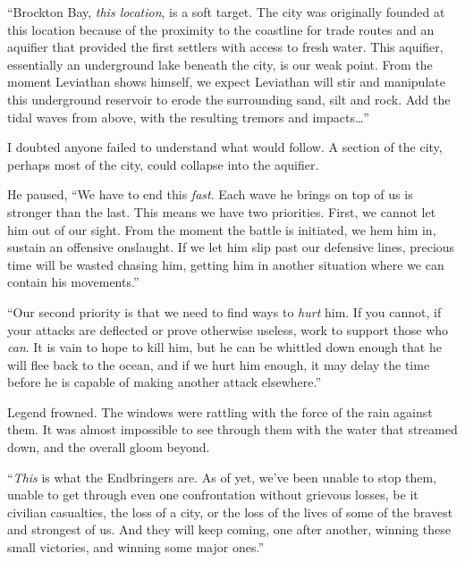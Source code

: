 ``Brockton Bay, \emph{this location}, is a soft target.  The city was originally founded at this location because of the proximity to the coastline for trade routes and an aquifier that provided the first settlers with access to fresh water.  This aquifier, essentially an underground lake beneath the city, is our weak point.  From the moment Leviathan shows himself, we expect Leviathan will stir and manipulate this underground reservoir to erode the surrounding sand, silt and rock.  Add the tidal waves from above, with the resulting tremors and impacts\ldots''



I doubted anyone failed to understand what would follow.  A section of the city, perhaps most of the city, could collapse into the aquifier.



He paused, ``We have to end this \emph{fast}.  Each wave he brings on top of us is stronger than the last.  This means we have two priorities.  First, we cannot let him out of our sight.  From the moment the battle is initiated, we hem him in, sustain an offensive onslaught.  If we let him slip past our defensive lines, precious time will be wasted chasing him, getting him in another situation where we can contain his movements.''



``Our second priority is that we need to find ways to \emph{hurt} him.  If you cannot, if your attacks are deflected or prove otherwise useless, work to support those who \emph{can}.  It is vain to hope to kill him, but he can be whittled down enough that he will flee back to the ocean, and if we hurt him enough, it may delay the time before he is capable of making another attack elsewhere.''



Legend frowned.  The windows were rattling with the force of the rain against them.  It was almost impossible to see through them with the water that streamed down, and the overall gloom beyond.



``\emph{This} is what the Endbringers are.  As of yet, we've been unable to stop them, unable to get through even one confrontation without grievous losses, be it civilian casualties, the loss of a city, or the loss of the lives of some of the bravest and strongest of us.  And they will keep coming, one after another, winning these small victories, and winning some major ones.''



